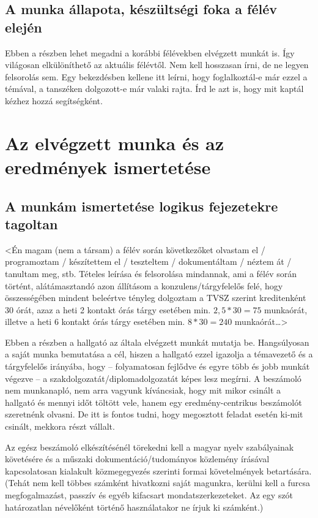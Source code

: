 \documentclass[a4paper,oneside]{article}
\begin{document}
\subsection{A munka állapota, készültségi foka a félév elején}
\label{sec:munka-allap-kesz}

Ebben a részben lehet megadni a korábbi félévekben elvégzett munkát
is.  Így világosan elkülöníthető az aktuális félévtől.  Nem kell
hosszasan írni, de ne legyen felsorolás sem.  Egy bekezdésben kellene
itt leírni, hogy foglalkoztál-e már ezzel a témával, a tanszéken
dolgozott-e már valaki rajta.  Írd le azt is, hogy mit kaptál kézhez
hozzá segítségként.

\newpage
\section{Az elvégzett munka és az eredmények ismertetése}
\label{sec:az-elvegzett-munka}


\subsection{A munkám ismertetése logikus fejezetekre tagoltan}
\label{sec:a-munkam-ismert}
<Én magam (nem a társam) a félév során következőket olvastam el /
programoztam / készítettem el / teszteltem / dokumentáltam / néztem át
/ tanultam meg, stb.  Tételes leírása és felsorolása mindannak, ami a
félév során történt, alátámasztandó azon állításom a
konzulens/tárgyfelelős felé, hogy összességében mindent beleértve
tényleg dolgoztam a TVSZ szerint kreditenként 30 órát, azaz a heti 2
kontakt órás tárgy esetében min. $2,5*30 = 75$ munkaórát, illetve a
heti 6 kontakt órás tárgy esetében min. $8*30 = 240$ munkaórát\dots>

Ebben a részben a hallgató az általa elvégzett munkát mutatja
be. Hangsúlyosan a saját munka bemutatása a cél, hiszen a hallgató
ezzel igazolja a témavezető és a tárgyfelelős irányába, hogy --
folyamatosan fejlődve és egyre több és jobb munkát végezve -- a
szakdolgozatát/diplomadolgozatát képes lesz megírni.  A beszámoló nem
munkanapló, nem arra vagyunk kíváncsiak, hogy mit mikor csinált a
hallgató és mennyi időt töltött vele, hanem egy eredmény-centrikus
beszámolót szeretnénk olvasni.  De itt is fontos tudni, hogy
megosztott feladat esetén ki-mit csinált, mekkora részt vállalt.

Az egész beszámoló elkészítésénél törekedni kell a magyar nyelv
szabályainak követésére és a műszaki dokumentáció/tudományos közlemény
írásával kapcsolatosan kialakult közmegegyezés szerinti formai
követelmények betartására.  (Tehát nem kell többes számként hivatkozni
saját magunkra, kerülni kell a furcsa megfogalmazást, passzív és egyéb
kifacsart mondatszerkezeteket.  Az egy szót határozatlan névelőként
történő használatakor ne írjuk ki számként.)
\end{document}
